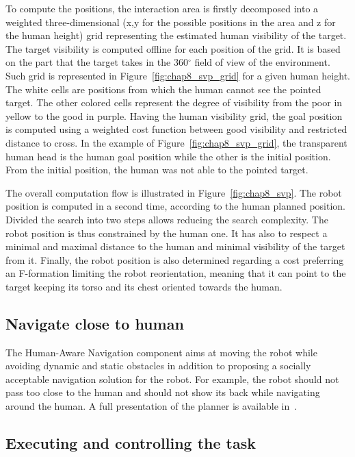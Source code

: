 To compute the positions, the interaction area is firstly decomposed into a weighted three-dimensional (x,y for the possible positions in the area and z for the human height) grid representing the estimated human visibility of the target. The target visibility is computed offline for each position of the grid. It is based on the part that the target takes in the 360${^\circ}$ field of view of the environment. Such grid is represented in Figure~\ref{fig:chap8_svp_grid} for a given human height. The white cells are positions from which the human cannot see the pointed target. The other colored cells represent the degree of visibility from the poor in yellow to the good in purple. Having the human visibility grid, the goal position is computed using a weighted cost function between good visibility and restricted distance to cross. In the example of Figure~\ref{fig:chap8_svp_grid}, the transparent human head is the human goal position while the other is the initial position. From the initial position, the human was not able to the pointed target.

The overall computation flow is illustrated in Figure~\ref{fig:chap8_svp}. The robot position is computed in a second time, according to the human planned position. Divided the search into two steps allows reducing the search complexity. The robot position is thus constrained by the human one. It has also to respect a minimal and maximal distance to the human and minimal visibility of the target from it. Finally, the robot position is also determined regarding a cost preferring an F-formation limiting the robot reorientation, meaning that it can point to the target keeping its torso and its chest oriented towards the human.

\subsection{Navigate close to human}

The Human-Aware Navigation component aims at moving the robot while avoiding dynamic and static obstacles in addition to proposing a socially acceptable navigation solution for the robot. For example, the robot should not pass too close to the human and should not show its back while navigating around the human. A full presentation of the planner is available in~\cite{singamaneni_2020_hateb}.

\subsection{Executing and controlling the task}

